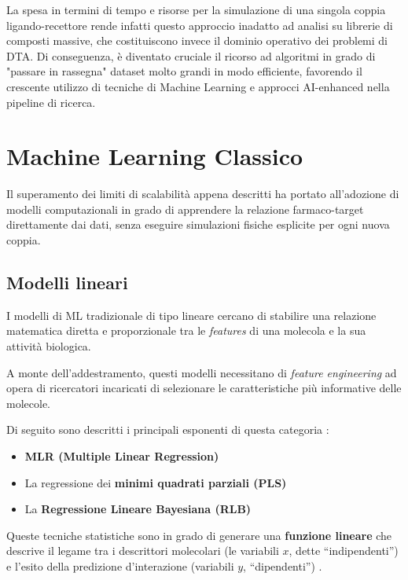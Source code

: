 La spesa in termini di tempo e risorse per la simulazione di una singola coppia ligando-recettore rende infatti questo approccio inadatto ad analisi su librerie di composti massive, che costituiscono invece il dominio operativo dei problemi di DTA.
Di conseguenza, è diventato cruciale il ricorso ad algoritmi in grado di "passare in rassegna" dataset molto grandi in modo efficiente, favorendo il crescente utilizzo di tecniche di Machine Learning e approcci AI-enhanced nella pipeline di ricerca.

\section{Machine Learning Classico}
Il superamento dei limiti di scalabilità appena descritti ha portato
all'adozione di modelli computazionali in grado di apprendere la relazione
farmaco-target direttamente dai dati, senza eseguire simulazioni fisiche
esplicite per ogni nuova coppia. %

\subsection{Modelli lineari}
I modelli di ML tradizionale di tipo lineare cercano di stabilire una relazione matematica diretta e proporzionale tra le \textit{features} di una molecola e la sua attività biologica.

A monte dell'addestramento, questi modelli necessitano di \textit{feature
engineering} ad opera di
ricercatori incaricati di selezionare le caratteristiche più informative delle molecole.

Di seguito sono descritti i principali esponenti di questa categoria
\cite{odugbemiArtificialIntelligenceAntidiabetic2024}:
\begin{itemize}
    \item \textbf{MLR (Multiple Linear Regression)}
    \item La regressione dei \textbf{minimi quadrati parziali (PLS)}
    \item La \textbf{Regressione Lineare Bayesiana (RLB)}
\end{itemize}
Queste tecniche statistiche sono in grado di generare una
\textbf{funzione lineare} che descrive il legame tra i descrittori molecolari
(le variabili $x$, dette ``indipendenti'') e l'esito della predizione d'interazione (variabili $y$, ``dipendenti'')
\cite{odugbemiArtificialIntelligenceAntidiabetic2024}.

